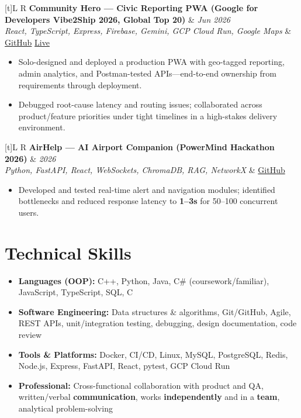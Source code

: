 \documentclass[a4paper,10pt]{article}
\newcommand{\resumeProject}[4]{%
  \vspace{0.5mm}
  \noindent
  \begin{tabularx}{\textwidth}[t]{L R}
    \textbf{#1} & \textit{#3} \\
    \textit{#2} & #4 \\
  \end{tabularx}
  \vspace{-0.5mm}%
}
\begin{document}
\resumeProject
  {Community Hero --- Civic Reporting PWA (Google for Developers Vibe2Ship 2026, Global Top 20)}
  {React, TypeScript, Express, Firebase, Gemini, GCP Cloud Run, Google Maps}
  {Jun 2026}
  {\href{https://github.com/Ojas-Srivastava05/community-hero}{GitHub} \textbar{} \href{https://community-hero-987477089222.asia-south1.run.app}{Live}}
\begin{itemize}
  \item Solo-designed and deployed a production PWA with geo-tagged reporting, admin analytics, and Postman-tested APIs---end-to-end ownership from requirements through deployment.
  \item Debugged root-cause latency and routing issues; collaborated across product/feature priorities under tight timelines in a high-stakes delivery environment.
\end{itemize}

\resumeProject
  {AirHelp --- AI Airport Companion (PowerMind Hackathon 2026)}
  {Python, FastAPI, React, WebSockets, ChromaDB, RAG, NetworkX}
  {2026}
  {\href{https://github.com/Ojas-Srivastava05/AirHelp-AI-Airport-Assistant}{GitHub}}
\begin{itemize}
  \item Developed and tested real-time alert and navigation modules; identified bottlenecks and reduced response latency to \textbf{1--3s} for 50--100 concurrent users.
\end{itemize}

\section{Technical Skills}
\small
\begin{itemize}[label={}]
  \item \textbf{Languages (OOP):} C++, Python, Java, C\# (coursework/familiar), JavaScript, TypeScript, SQL, C
  \item \textbf{Software Engineering:} Data structures \& algorithms, Git/GitHub, Agile, REST APIs, unit/integration testing, debugging, design documentation, code review
  \item \textbf{Tools \& Platforms:} Docker, CI/CD, Linux, MySQL, PostgreSQL, Redis, Node.js, Express, FastAPI, React, pytest, GCP Cloud Run
  \item \textbf{Professional:} Cross-functional collaboration with product and QA, written/verbal \textbf{communication}, works \textbf{independently} and in a \textbf{team}, analytical problem-solving
\end{itemize}
\end{document}
